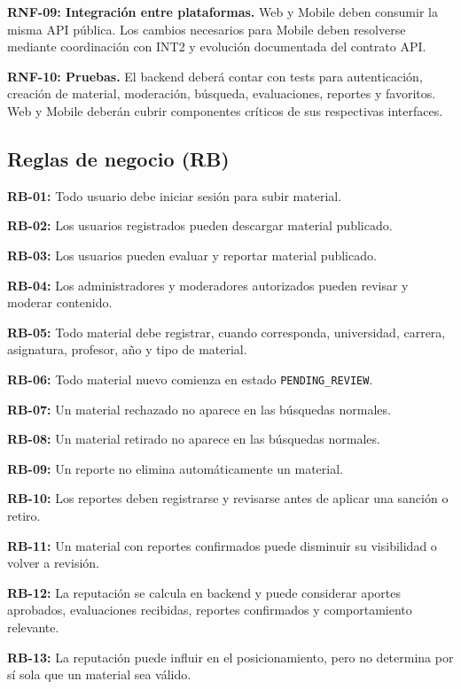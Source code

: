 \documentclass[12pt,a4paper]{article}
\begin{document}
\noindent\textbf{RNF-09: Integración entre plataformas.} Web y Mobile deben consumir la misma API pública. Los cambios necesarios para Mobile deben resolverse mediante coordinación con INT2 y evolución documentada del contrato API.

\noindent\textbf{RNF-10: Pruebas.} El backend deberá contar con tests para autenticación, creación de material, moderación, búsqueda, evaluaciones, reportes y favoritos. Web y Mobile deberán cubrir componentes críticos de sus respectivas interfaces.

\subsection{Reglas de negocio (RB)}

\noindent\textbf{RB-01:} Todo usuario debe iniciar sesión para subir material.

\noindent\textbf{RB-02:} Los usuarios registrados pueden descargar material publicado.

\noindent\textbf{RB-03:} Los usuarios pueden evaluar y reportar material publicado.

\noindent\textbf{RB-04:} Los administradores y moderadores autorizados pueden revisar y moderar contenido.

\noindent\textbf{RB-05:} Todo material debe registrar, cuando corresponda, universidad, carrera, asignatura, profesor, año y tipo de material.

\noindent\textbf{RB-06:} Todo material nuevo comienza en estado \texttt{PENDING\_REVIEW}.

\noindent\textbf{RB-07:} Un material rechazado no aparece en las búsquedas normales.

\noindent\textbf{RB-08:} Un material retirado no aparece en las búsquedas normales.

\noindent\textbf{RB-09:} Un reporte no elimina automáticamente un material.

\noindent\textbf{RB-10:} Los reportes deben registrarse y revisarse antes de aplicar una sanción o retiro.

\noindent\textbf{RB-11:} Un material con reportes confirmados puede disminuir su visibilidad o volver a revisión.

\noindent\textbf{RB-12:} La reputación se calcula en backend y puede considerar aportes aprobados, evaluaciones recibidas, reportes confirmados y comportamiento relevante.

\noindent\textbf{RB-13:} La reputación puede influir en el posicionamiento, pero no determina por sí sola que un material sea válido.
\end{document}
